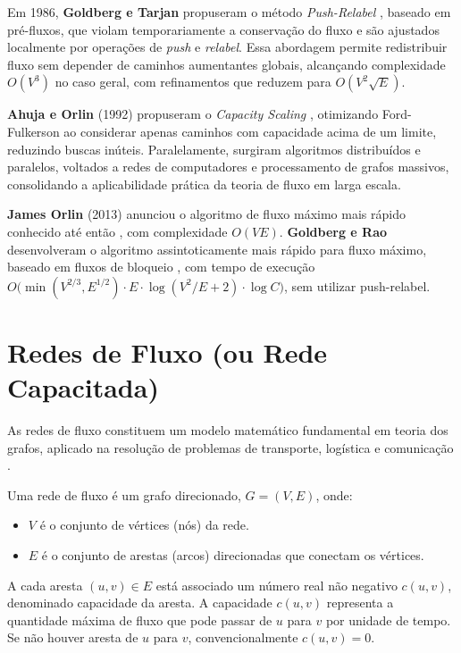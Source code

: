 \documentclass[12pt]{article}
\begin{document}
Em 1986, \textbf{Goldberg e Tarjan} propuseram o método \textit{Push-Relabel} \cite{goldberg1988}, baseado em pré-fluxos, que violam temporariamente a conservação do fluxo e são ajustados localmente por operações de \textit{push} e \textit{relabel}. Essa abordagem permite redistribuir fluxo sem depender de caminhos aumentantes globais, alcançando complexidade $O(V^3)$ no caso geral, com refinamentos que reduzem para $O(V^2 \sqrt{E})$.

\textbf{Ahuja e Orlin} (1992) propuseram o \textit{Capacity Scaling} \cite{ahuja1993}, otimizando Ford-Fulkerson ao considerar apenas caminhos com capacidade acima de um limite, reduzindo buscas inúteis. Paralelamente, surgiram algoritmos distribuídos e paralelos, voltados a redes de computadores e processamento de grafos massivos, consolidando a aplicabilidade prática da teoria de fluxo em larga escala.

\textbf{James Orlin} (2013) anunciou o algoritmo de fluxo máximo mais rápido conhecido até então \cite{orlin2013}, com complexidade $O(VE)$. \textbf{Goldberg e Rao} desenvolveram o algoritmo assintoticamente mais rápido para fluxo máximo, baseado em fluxos de bloqueio \cite{goldberg1998}, com tempo de execução $O\big(\min(V^{2/3}, E^{1/2}) \cdot E \cdot \log(V^2/E + 2) \cdot \log C \big)$, sem utilizar push-relabel.

\newpage
\section{Redes de Fluxo  (ou Rede Capacitada)} 

As redes de fluxo constituem um modelo matemático fundamental em teoria dos grafos, aplicado na resolução de problemas de transporte, logística e comunicação \cite{ahuja1993,cormen2009}.

Uma rede de fluxo é um grafo direcionado, $G = (V, E)$, onde:

\begin{itemize}
    \item $V$ é o conjunto de vértices (nós) da rede.
    \item $E$ é o conjunto de arestas (arcos) direcionadas que conectam os vértices.
\end{itemize}

\noindent A cada aresta $(u, v) \in E$ está associado um número real não negativo $c(u, v)$, denominado capacidade da aresta. A capacidade $c(u, v)$ representa a quantidade máxima de fluxo que pode passar de $u$ para $v$ por unidade de tempo. Se não houver aresta de $u$ para $v$, convencionalmente $c(u, v) = 0$.
\end{document}
